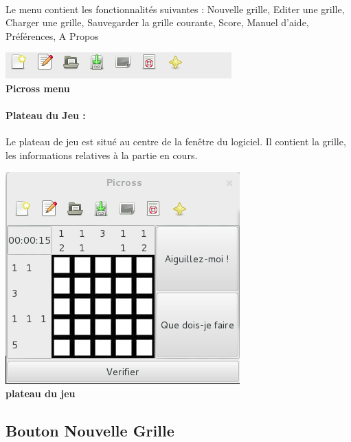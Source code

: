         \paragraph*{}
        Le menu contient les fonctionnalités suivantes : Nouvelle grille, Editer une grille, Charger une grille, Sauvegarder la grille courante, Score, Manuel d'aide, Préférences, A Propos \\
        
               \begin{center}
                      \includegraphics[scale=0.6]{data/screenMaquette/menu.png}\\
                      \textbf{Picross menu}
                      \end{center}


   \paragraph{Plateau du Jeu : }
              Le plateau de jeu est situé au centre de la fenêtre du logiciel. Il contient la grille, les informations relatives à la partie en cours. 
              
              
               \begin{center}
                      \includegraphics[scale=0.6]{data/screenMaquette/plateau.png}\\
                      \textbf{  plateau du jeu}\\
                      \end{center}
              

        \subsection{Bouton Nouvelle Grille}
        
